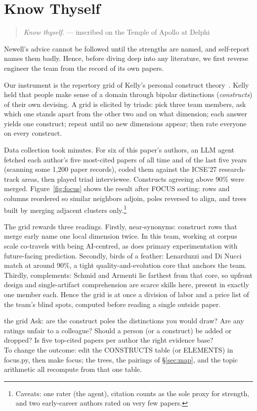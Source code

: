 \section{Know Thyself}
\label{sec:know}

\begin{quote}
{\em Know thyself.} --- inscribed on the Temple of Apollo at Delphi
\end{quote}

Newell's advice cannot be followed until the strengths are named, and
self-report names them badly.
Hence, before diving deep into any literature, we first reverse
engineer the team from the record of its own papers.

Our instrument is the repertory grid of Kelly's personal construct
theory~\cite{kelly55}.
Kelly held that people make sense of a domain through bipolar
distinctions ({\em constructs}) of their own devising.
A grid is elicited by triads: pick three team members, ask which one
stands apart from the other two and on what dimension; each answer
yields one construct; repeat until no new dimensions appear; then rate
everyone on every construct.

Data collection took minutes.
For six of this paper's authors, an LLM agent fetched each author's
five most-cited papers of all time and of the last five years
(scanning some 1,200 paper records), coded them against the ICSE'27
research-track areas, then played triad interviewee.
Constructs agreeing above 90\% were merged.
Figure~\ref{fig:focus} shows the result after FOCUS sorting: rows and
columns reordered so similar neighbors adjoin, poles reversed to
align, and trees built by merging adjacent clusters
only.\footnote{Caveats: one rater (the agent), citation counts as the
sole proxy for strength, and two early-career authors rated on very
few papers.}

The grid rewards three readings.
Firstly, near-synonyms: construct rows that merge early name one local
dimension twice.
In this team, working at corpus scale co-travels with being
AI-centred, as does primary experimentation with future-facing
prediction.
Secondly, birds of a feather: Lenarduzzi and Di Nucci match at around
90\%, a tight quality-and-evolution core that anchors the team.
Thirdly, complements: Schmid and Armenti lie farthest from that core,
so upfront design and single-artifact comprehension are scarce skills
here, present in exactly one member each.
Hence the grid is at once a division of labor and a price list of the
team's blind spots, computed before reading a single outside paper.

\begin{pause}{the grid}
Ask: are the construct poles the distinctions you would draw?
Are any ratings unfair to a colleague?
Should a person (or a construct) be added or dropped?
Is five top-cited papers per author the right evidence base?\\[0.2em]
To change the outcome: edit the {\ttfamily CONSTRUCTS} table (or
{\ttfamily ELEMENTS}) in {\ttfamily focus.py}, then {\ttfamily make
focus}; the trees, the pairings of \S\ref{sec:map}, and the topic
arithmetic all recompute from that one table.
\end{pause}
